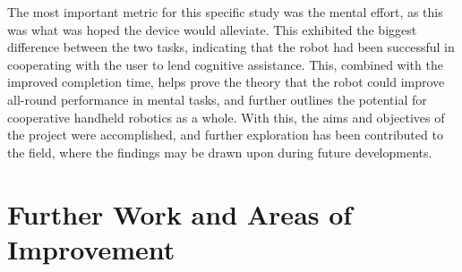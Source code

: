\documentclass[11pt]{article}
\begin{document}
The most important metric for this specific study was the mental effort, as this was what was hoped the device would alleviate. This exhibited the biggest difference between the two tasks, indicating that the robot had been successful in cooperating with the user to lend cognitive assistance. This, combined with the improved completion time, helps prove the theory that the robot could improve all-round performance in mental tasks, and further outlines the potential for cooperative handheld robotics as a whole. With this, the aims and objectives of the project were accomplished, and further exploration has been contributed to the field, where the findings may be drawn upon during future developments. 




 

\pagebreak
\section{Further Work and Areas of Improvement}

\pagebreak



\pagebreak
\pagestyle{roman}
\end{document}

